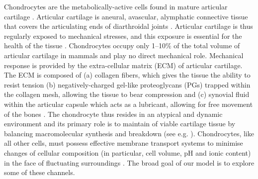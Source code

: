 Chondrocytes are the metabolically-active cells found in mature
articular cartilage \citep{BarrettJolleyetal2010}. Articular cartilage
is aneural, avascular, alymphatic connective tissue that covers the
articulating ends of diarthroidal joints \citep{Poole1997,
Mankin1982}. Articular cartilage is thus regularly exposed to
mechanical stresses, and this exposure is essential for the health of
the tissue \citep{Stockwell1991}. Chondrocytes occupy only 1--10\% of
the total volume of articular cartilage in mammals
\citep{CarneyMuir1988, Halletal1996} and play no direct mechanical
role. Mechanical response is provided by the extra-cellular matrix
(ECM) of articular cartilage. The ECM is composed of (a) collagen
fibers, which gives the tissue the ability to resist tension (b)
negatively-charged gel-like proteoglycans (PGs) trapped within the
collagen mesh, allowing the tissue to bear compression
\citep{Poole1997, BuckwalterMankin1998} and (c) synovial fluid within
the articular capsule which acts as a lubricant, allowing for free
movement of the bones \citep{Edwardsetal1994}. The chondrocyte thus
resides in an atypical and dynamic environment and its primary role is
to maintain of viable cartilage tissue by balancing macromolecular
synthesis and breakdown (see e.g. \citet{Wilkinsetal2000,
Stockwell1991, Fassbender1987}). Chondrocytes, like all other cells,
must possess effective membrane transport systems to minimise changes
of cellular composition (in particular, cell volume, pH and ionic
content) in the face of fluctuating surroundings \citep{Halletal1996,
  Mobasherietal1998, Stein1990}. The broad goal of our model is to
explore some of these channels.

